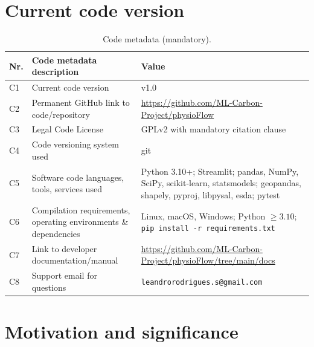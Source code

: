 \documentclass[preprint,12pt,a4paper]{elsarticle}
\begin{document}
\section*{Current code version}

\begin{table}[!h]
\centering
\footnotesize
\begin{tabular}{|l|p{4.5cm}|p{6.5cm}|}
\hline
\textbf{Nr.} & \textbf{Code metadata description} & \textbf{Value} \\
\hline
C1 & Current code version & v1.0 \\
\hline
C2 & Permanent GitHub link to code/repository & \url{https://github.com/ML-Carbon-Project/physioFlow} \\
\hline
C3 & Legal Code License & GPLv2 with mandatory citation clause \\
\hline
C4 & Code versioning system used & git \\
\hline
C5 & Software code languages, tools, services used & Python 3.10+; Streamlit; pandas, NumPy, SciPy, scikit-learn, statsmodels; geopandas, shapely, pyproj, libpysal, esda; pytest \\
\hline
C6 & Compilation requirements, operating environments \& dependencies & Linux, macOS, Windows; Python $\geq 3.10$; \texttt{pip install -r requirements.txt} \\
\hline
C7 & Link to developer documentation/manual & \url{https://github.com/ML-Carbon-Project/physioFlow/tree/main/docs} \\
\hline
C8 & Support email for questions & \texttt{leandrorodrigues.s@gmail.com} \\
\hline
\end{tabular}
\caption{Code metadata (mandatory).}
\label{tbl:metadata}
\end{table}

\section{Motivation and significance}\label{sec:intro}
\end{document}
